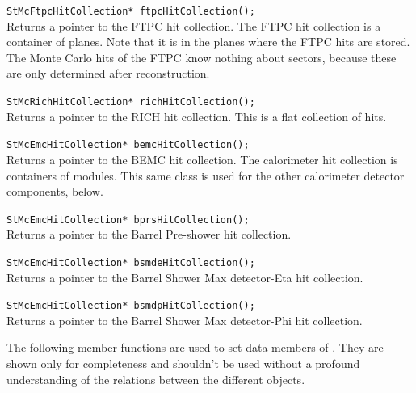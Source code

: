 \begin{Entry}
    \verb+StMcFtpcHitCollection* ftpcHitCollection();+\\
    Returns a pointer to the FTPC hit collection. The FTPC hit
    collection is a container of planes.  Note that it is in the planes 
    where the FTPC hits are stored.  The Monte Carlo hits of the FTPC
    know nothing about sectors, because these are only determined
    after reconstruction.

    \verb+StMcRichHitCollection* richHitCollection();+\\
    Returns a pointer to the RICH hit collection. This is a flat collection
    of hits.

    \verb+StMcEmcHitCollection* bemcHitCollection();+\\
    Returns a pointer to the BEMC hit collection. The calorimeter hit
    collection is containers of modules.  This same class is used for
    the other calorimeter detector components, below.

    \verb+StMcEmcHitCollection* bprsHitCollection();+\\
    Returns a pointer to the Barrel Pre-shower hit collection.

    \verb+StMcEmcHitCollection* bsmdeHitCollection();+\\
    Returns a pointer to the Barrel Shower Max detector-Eta hit collection.

    \verb+StMcEmcHitCollection* bsmdpHitCollection();+\\
    Returns a pointer to the Barrel Shower Max detector-Phi hit collection.

    The following member functions are used to set data members of .
    They are shown only for completeness and shouldn't be used without
    a profound understanding of the relations between the different objects.


\end{Entry}
